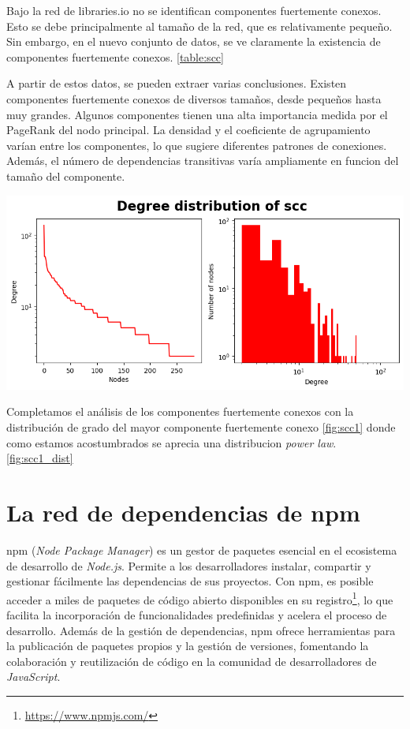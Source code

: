 Bajo la red de libraries.io no se identifican componentes fuertemente conexos. Esto se debe principalmente
al tamaño de la red, que es relativamente pequeño. Sin embargo, en el nuevo conjunto de datos, se ve claramente
la existencia de componentes fuertemente conexos. \ref{table:scc}

A partir de estos datos, se pueden extraer varias conclusiones. Existen componentes fuertemente conexos de diversos
tamaños, desde pequeños hasta muy grandes. Algunos componentes tienen una alta importancia medida por el PageRank
del nodo principal. La densidad y el coeficiente de agrupamiento varían entre los componentes, lo que sugiere diferentes
patrones de conexiones. Además, el número de dependencias transitivas varía ampliamente en funcion del tamaño del componente.

    \begin{center}
        \includegraphics[width=1\textwidth]{img/pypi/scc1_dist.png}
        \label{fig:scc1_dist}
    \end{center}



Completamos el análisis de los componentes fuertemente conexos con la distribución de grado del mayor componente fuertemente
conexo \ref{fig:scc1} donde como estamos acostumbrados se aprecia una distribucion \textit{power law}. \ref{fig:scc1_dist}


\newpage
\section{La red de dependencias de npm}




npm (\textit{Node Package Manager}) es un gestor de paquetes esencial en el ecosistema de
desarrollo de \textit{Node.js}. Permite a los desarrolladores instalar, compartir y gestionar
fácilmente las dependencias de sus proyectos. Con npm, es posible acceder a miles de
paquetes de código abierto disponibles en su registro\footnote{\url{https://www.npmjs.com/}},
lo que facilita la incorporación de funcionalidades predefinidas y acelera el proceso de
desarrollo. Además de la gestión de dependencias, npm ofrece herramientas para la publicación
de paquetes propios y la gestión de versiones, fomentando la colaboración y reutilización de
código en la comunidad de desarrolladores de \textit{JavaScript}.

